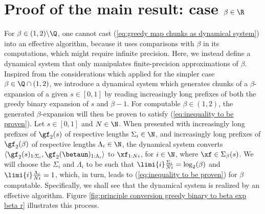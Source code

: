 
\section{\texorpdfstring{Proof of the main result: case $\beta \in \R$}{}}



For $\beta \in (1,2) \backslash \Q$, one cannot cast (\ref{eq:greedy map chunks as dynamical system}) into an effective algorithm, because it uses comparisons with $\beta$ in its computations, which might require infinite precision. Here, we instead define a dynamical system that only manipulates finite-precision approximations of $\beta$. Inspired from the considerations which applied for the simpler case $\beta \in \Q \cap (1,2)$, we introduce a dynamical system which generates chunks of a $\beta$-expansion of a given $s \in [0,1]$ by reading increasingly long prefixes of both the greedy binary expansion of $s$ and $\beta - 1$. For computable $\beta \in (1,2)$, the generated $\beta$-expansion will then be proven to satisfy (\ref{eq:inequality to be proven}). Let $s \in [0,1]$ and $N\in \N$. When presented with increasingly long prefixes of $\gf_2(s)$ of respective lengths $\Sigma_i \in \N$, and increasingly long prefixes of $\gf_2(\beta)$ of respective lengths $\Lambda_i \in \N$, the dynamical system converts $\langle \gf_2(s)_{1: \Sigma_i}, \gf_2(\betaun)_{1: \Lambda_i}\rangle$ to $\xf_{1: Ni}$, for $i \in \N$, where $\xf \in \Sigma_\beta(s)$. We will choose the $\Sigma_i$ and $\Lambda_i$ to be such that $\limi{i} \frac{\Sigma_i}{Ni} = \log_2(\beta)$ and $\limi{i} \frac{\Lambda_i}{Ni} = 1$, which, in turn, leads to (\ref{eq:inequality to be proven}) for $\beta$ computable. Specifically, we shall see that the dynamical system is realized by an effective algorithm. Figure \ref{fig:principle conversion greedy binary to beta exp beta r} illustrates this process. 

